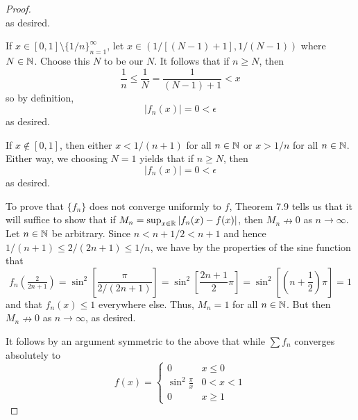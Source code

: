 \documentclass[../psets.tex]{subfiles}
\begin{document}
\begin{enumerate}[label={\textbf{\arabic*.}}]
\begin{proof}
\begin{equation*}
        \end{equation*}
        as desired.\par
        If $x\in[0,1]\setminus\{1/n\}_{n=1}^\infty$, let $x\in(1/[(N-1)+1],1/(N-1))$ where $N\in\mathbb{N}$. Choose this $N$ to be our $N$. It follows that if $n\geq N$, then
        \begin{equation*}
            \frac{1}{n} \leq \frac{1}{N}
            = \frac{1}{(N-1)+1}
            < x
        \end{equation*}
        so by definition,
        \begin{equation*}
            |f_n(x)| = 0 < \epsilon
        \end{equation*}
        as desired.\par
        If $x\notin[0,1]$, then either $x<1/(n+1)$ for all $n\in\mathbb{N}$ or $x>1/n$ for all $n\in\mathbb{N}$. Either way, we choosing $N=1$ yields that if $n\geq N$, then
        \begin{equation*}
            |f_n(x)| = 0 < \epsilon
        \end{equation*}
        as desired.\par\medskip
        To prove that $\{f_n\}$ does not converge uniformly to $f$, Theorem 7.9 tells us that it will suffice to show that if $M_n=\sup_{x\in\mathbb{R}}|f_n(x)-f(x)|$, then $M_n\nrightarrow 0$ as $n\to\infty$. Let $n\in\mathbb{N}$ be arbitrary. Since $n<n+1/2<n+1$ and hence $1/(n+1)\leq 2/(2n+1)\leq 1/n$, we have by the properties of the sine function that
        \begin{equation*}
            f_n(\tfrac{2}{2n+1}) = \sin^2\left[ \frac{\pi}{2/(2n+1)} \right]
            = \sin^2\left[ \frac{2n+1}{2}\pi \right]
            = \sin^2\left[ \left( n+\frac{1}{2} \right)\pi \right]
            = 1
        \end{equation*}
        and that $f_n(x)\leq 1$ everywhere else. Thus, $M_n=1$ for all $n\in\mathbb{N}$. But then $M_n\nrightarrow 0$ as $n\to\infty$, as desired.\par\medskip
        It follows by an argument symmetric to the above that while $\sum f_n$ converges absolutely to
        \begin{equation*}
            f(x) =
            \begin{cases}
                0 & x\leq 0\\
                \sin^2\frac{\pi}{x} & 0<x<1\\
                0 & x\geq 1
            \end{cases}
        \end{equation*}

\end{proof}
\end{enumerate}
\end{document}
